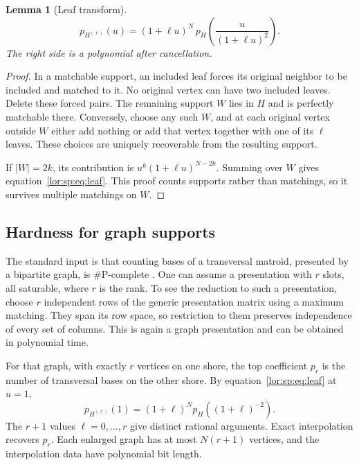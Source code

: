 \documentclass[11pt]{article}
\numberwithin{equation}{section}
\newtheorem{lemma}[theorem]{Lemma}
\theoremstyle{definition}
\begin{document}
\begin{lemma}[Leaf transform]
\label{lor:sp:lem:leaf}
\begin{equation}
 p_{H^{(\ell)}}(u)
 =(1+\ell u)^N\,
 p_H\left(\frac{u}{(1+\ell u)^2}\right).
 \label{lor:sp:eq:leaf}
\end{equation}
The right side is a polynomial after cancellation.
\end{lemma}
\begin{proof}
In a matchable support, an included leaf forces its original neighbor to be
included and matched to it. No original vertex can have two included leaves.
Delete these forced pairs. The remaining support $W$ lies in $H$ and is
perfectly matchable there. Conversely, choose any such $W$, and at each
original vertex outside $W$ either add nothing or add that vertex together
with one of its $\ell$ leaves. These choices are uniquely recoverable from
the resulting support.

If $|W|=2k$, its contribution is
$u^k(1+\ell u)^{N-2k}$. Summing over $W$ gives equation~\eqref{lor:sp:eq:leaf}. This proof
counts supports rather than matchings, so it survives multiple matchings on $W$.
\end{proof}

\subsection{Hardness for graph supports}
The standard input is that counting bases of a transversal matroid, presented
by a bipartite graph, is $\#\mathrm P$-complete
\cite{CPV}. One can assume a presentation with $r$ slots, all saturable, where
$r$ is the rank. To see the reduction to such a presentation, choose $r$
independent rows of the generic presentation matrix using a maximum matching.
They span its row space, so restriction to them preserves independence of every
set of columns. This is again a graph presentation and can be obtained in
polynomial time.

For that graph, with exactly $r$ vertices on one shore, the top coefficient
$p_r$ is the number of transversal bases on the other shore. By
equation~\eqref{lor:sp:eq:leaf} at $u=1$,
\begin{equation}
 p_{H^{(\ell)}}(1)=(1+\ell)^N
       p_H((1+\ell)^{-2}).
 \label{lor:sp:eq:interpolate}
\end{equation}
The $r+1$ values $\ell=0,\ldots,r$ give distinct rational arguments.
Exact interpolation recovers $p_r$. Each enlarged graph has at most
$N(r+1)$ vertices, and the interpolation data have polynomial bit length.
\end{document}
